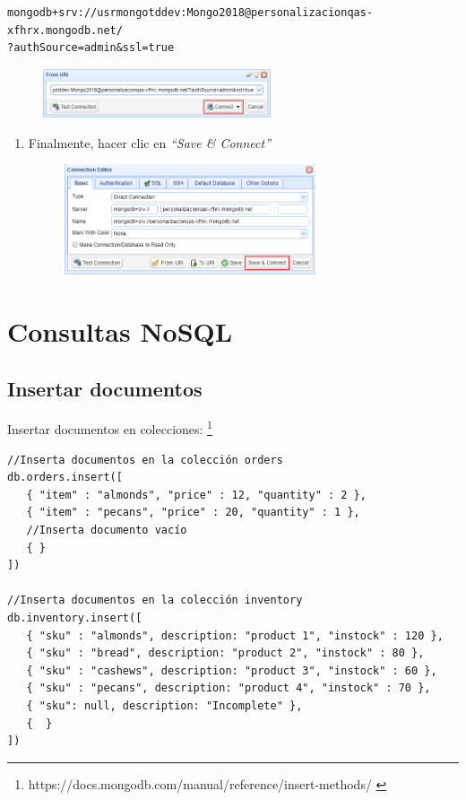 \documentclass[a4paper,11pt]{paper}
\begin{document}
\begin{verbatim}
mongodb+srv://usrmongotddev:Mongo2018@personalizacionqas-xfhrx.mongodb.net/
?authSource=admin&ssl=true
\end{verbatim}

\begin{figure}[!h]
\centering
\includegraphics[width=0.6\textwidth]{imgs/instalacion/Conexion2.png}
\end{figure}

\begin{enumerate}
\def\labelenumi{\arabic{enumi}.}
\setcounter{enumi}{7}
\item
  Finalmente, hacer clic en \emph{``Save \& Connect''}

  \begin{figure}[!h]
  \centering
  \includegraphics[width=0.7\textwidth]{imgs/instalacion/Conexion3.png}
  \end{figure}
\end{enumerate}

\newpage
\section{Consultas NoSQL}

\hypertarget{insertar-documentos}{%
\subsection{Insertar documentos}\label{insertar-documentos}}

Insertar documentos en colecciones: \footnote{https://docs.mongodb.com/manual/reference/insert-methods/ \cite{doc}}

\begin{verbatim}
//Inserta documentos en la colección orders
db.orders.insert([
   { "item" : "almonds", "price" : 12, "quantity" : 2 },
   { "item" : "pecans", "price" : 20, "quantity" : 1 },
   //Inserta documento vacío
   { }
])

//Inserta documentos en la colección inventory
db.inventory.insert([
   { "sku" : "almonds", description: "product 1", "instock" : 120 },
   { "sku" : "bread", description: "product 2", "instock" : 80 },
   { "sku" : "cashews", description: "product 3", "instock" : 60 },
   { "sku" : "pecans", description: "product 4", "instock" : 70 },
   { "sku": null, description: "Incomplete" },
   {  }
])
\end{verbatim}
\end{document}
